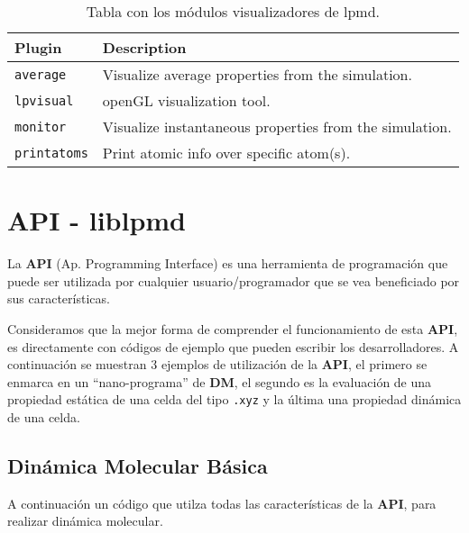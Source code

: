 \begin{table}[h!]\centering
 \begin{tabular}{|l|p{13cm}|}\hline
 Plugin & Description \\
 \hline\hline
 \texttt{average} & Visualize average properties from the simulation.\\
 \hline
 \texttt{lpvisual} & openGL visualization tool.\\
 \hline
 \texttt{monitor} & Visualize instantaneous properties from the simulation.\\
 \hline
 \texttt{printatoms} & Print atomic info over specific atom(s).\\
 \hline
 \end{tabular}
\label{tab:modgvisual}
\caption{Tabla con los m\'odulos visualizadores de lpmd.}
\end{table}


\chapter{API - liblpmd}
\label{ap:API}

La \textbf{API} (Ap. Programming Interface) es una herramienta de programaci\'on
que puede ser utilizada por cualquier usuario/programador que se vea beneficiado
por sus caracter\'isticas.


Consideramos que la mejor forma de comprender el funcionamiento de esta
\textbf{API}, es directamente con c\'odigos de ejemplo que pueden escribir los
desarrolladores. A continuaci\'on se muestran 3 ejemplos de utilizaci\'on de la
\textbf{API}, el primero se enmarca en un ``nano-programa'' de \textbf{DM}, el
segundo es la evaluaci\'on de una propiedad est\'atica de una celda del tipo
\texttt{.xyz} y la \'ultima una propiedad din\'amica de una celda.

\section{Din\'amica Molecular B\'asica}
A continuaci\'on un c\'odigo que utilza todas las caracter\'isticas de la
\textbf{API}, para realizar din\'amica molecular.

